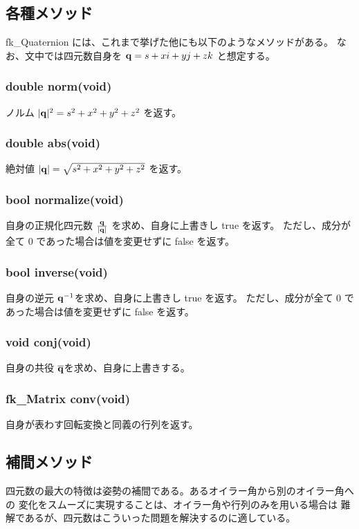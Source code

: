 \subsection{各種メソッド}
fk\_Quaternion には、これまで挙げた他にも以下のようなメソッドがある。
なお、文中では四元数自身を \(\mathbf{q} = s + xi + yj + zk\) と想定する。

\subsubsection*{double norm(void)}
ノルム \(|\mathbf{q}|^2 = s^2 + x^2 + y^2 + z^2\) を返す。

\subsubsection*{double abs(void)}
絶対値 \(|\mathbf{q}| = \sqrt{s^2 + x^2 + y^2 + z^2}\) を返す。

\subsubsection*{bool normalize(void)}
自身の正規化四元数 \(\frac{\mathbf{q}}{|\mathbf{q}|}\) を求め、自身に上書きし true を返す。
ただし、成分が全て 0 であった場合は値を変更せずに false を返す。

\subsubsection*{bool inverse(void)}
自身の逆元 \(\mathbf{q}^{-1}\)を求め、自身に上書きし true を返す。
ただし、成分が全て 0 であった場合は値を変更せずに false を返す。

\subsubsection*{void conj(void)}
自身の共役 \(\overline{\mathbf{q}}\)を求め、自身に上書きする。

\subsubsection*{fk\_Matrix conv(void)}
自身が表わす回転変換と同義の行列を返す。

\subsection{補間メソッド}
四元数の最大の特徴は姿勢の補間である。あるオイラー角から別のオイラー角への
変化をスムーズに実現することは、オイラー角や行列のみを用いる場合は
難解であるが、四元数はこういった問題を解決するのに適している。

